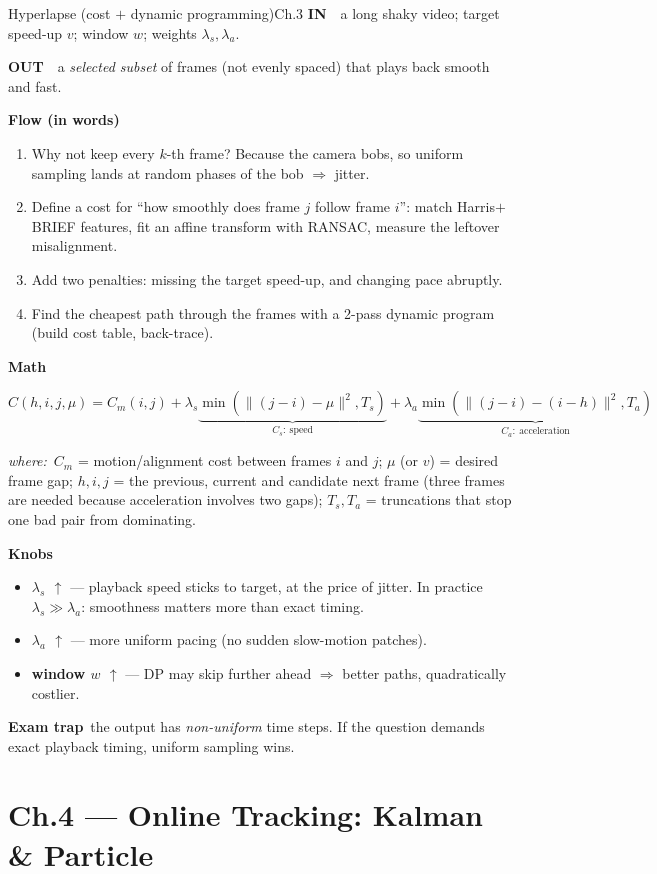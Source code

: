 \documentclass[9pt,a4paper]{extarticle}
\newcommand{\IN}{\textbf{\color{cIn}IN}\ }
\newcommand{\OUT}{\par\textbf{\color{cOut}OUT}\ }
\newcommand{\FLOW}{\par\smallskip\textbf{Flow (in words)}\par\nopagebreak}
\newcommand{\MATH}{\par\smallskip\textbf{Math}\par\nopagebreak}
\newcommand{\KNOBS}{\par\smallskip\textbf{Knobs}\par\nopagebreak}
\newcommand{\TRAP}{\par\smallskip\textbf{\color{cTrap}Exam trap}\ }
\newcommand{\WHERE}{\par\textit{where:}\ }
\newcommand{\up}{$\uparrow$}
\newcommand{\kn}[2]{\item \textbf{#1} --- #2}
\begin{document}
\begin{card}{Hyperlapse (cost $+$ dynamic programming)}{Ch.3}
\IN\ a long shaky video; target speed-up $v$; window $w$; weights $\lambda_s,\lambda_a$.
\OUT\ a \emph{selected subset} of frames (not evenly spaced) that plays back smooth and fast.

\FLOW
\begin{enumerate}
  \item Why not keep every $k$-th frame? Because the camera bobs, so uniform sampling lands at random phases of the bob $\Rightarrow$ jitter.
  \item Define a cost for ``how smoothly does frame $j$ follow frame $i$'': match Harris$+$BRIEF features, fit an affine transform with RANSAC, measure the leftover misalignment.
  \item Add two penalties: missing the target speed-up, and changing pace abruptly.
  \item Find the cheapest path through the frames with a 2-pass dynamic program (build cost table, back-trace).
\end{enumerate}

\MATH
\[ C(h,i,j,\mu)=C_m(i,j)+\lambda_s\underbrace{\min(\|(j-i)-\mu\|^2,T_s)}_{C_s:\ \text{speed}}+\lambda_a\underbrace{\min(\|(j-i)-(i-h)\|^2,T_a)}_{C_a:\ \text{acceleration}} \]
\WHERE $C_m$ = motion/alignment cost between frames $i$ and $j$; $\mu$ (or $v$) = desired frame gap; $h,i,j$ = the previous, current and candidate next frame (three frames are needed because acceleration involves two gaps); $T_s,T_a$ = truncations that stop one bad pair from dominating.

\KNOBS
\begin{itemize}
  \kn{$\lambda_s$ \up}{playback speed sticks to target, at the price of jitter. In practice $\lambda_s\gg\lambda_a$: smoothness matters more than exact timing.}
  \kn{$\lambda_a$ \up}{more uniform pacing (no sudden slow-motion patches).}
  \kn{window $w$ \up}{DP may skip further ahead $\Rightarrow$ better paths, quadratically costlier.}
\end{itemize}
\TRAP the output has \emph{non-uniform} time steps. If the question demands exact playback timing, uniform sampling wins.
\end{card}

\section{Ch.4 --- Online Tracking: Kalman \& Particle}
\end{document}
